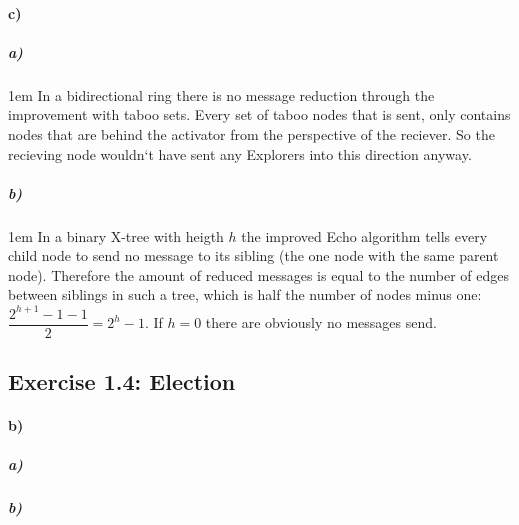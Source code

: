 \documentclass[12pt,a4paper]{article}
\begin{document}
\paragraph{c)}
\subparagraph{a)}
\begingroup
\leftskip1em
In a bidirectional ring there is no message reduction through the improvement with taboo sets. Every set of taboo nodes that is sent, only contains nodes that are behind the activator from the perspective of the reciever. So the recieving node wouldn`t have sent any Explorers into this direction anyway.
\par
\endgroup
\subparagraph{b)}
\begingroup
\leftskip1em
In a binary X-tree with heigth $h$ the improved Echo algorithm tells every child node to send no message to its sibling (the one node with the same parent node). Therefore the amount of reduced messages is equal to the number of edges between siblings in such a tree, which is half the number of nodes minus one: $\dfrac{2^{h+1}-1-1}{2}=2^{h}-1$. If $h=0$ there are obviously no messages send.
\par
\endgroup


\subsection*{Exercise 1.4: Election}
\paragraph{b)} %
\subparagraph{a)} %
\subparagraph{b)} %
\end{document}
